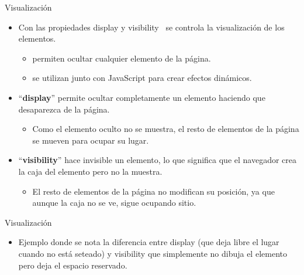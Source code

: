 \documentclass[aspectratio=43,10pt,t]{beamer}
\begin{document}
\begin{frame}{Visualización}\relax
\begingroup
{}
\begin{itemize}
  \item\relax Con las propiedades display y visibility ~se controla la visualización de los elementos. 
  \begin{itemize}
    \item\relax permiten ocultar cualquier elemento de la página. 
    \item\relax se utilizan junto con JavaScript para crear efectos dinámicos.
  \end{itemize}
  \item\relax “\textbf{display}” permite ocultar completamente un elemento haciendo que desaparezca de la página. 
  \begin{itemize}
    \item\relax Como el elemento oculto no se muestra, el resto de elementos de la página se mueven para ocupar su lugar.
  \end{itemize}
  \item\relax “\textbf{visibility}” hace invisible un elemento, lo que significa que el navegador crea la caja del elemento pero no la muestra. 
  \begin{itemize}
    \item\relax El resto de elementos de la página no modifican su posición, ya que aunque la caja no se ve, sigue ocupando sitio.
  \end{itemize}
\end{itemize}
\endgroup
\end{frame}

\begin{frame}{Visualización}\relax
\begingroup
{}
\begin{itemize}
  \item\relax Ejemplo donde se nota la diferencia entre display (que deja libre el lugar cuando no está seteado) y visibility que simplemente no dibuja el elemento pero deja el espacio reservado.
\end{itemize}
\endgroup
{}
\end{frame}
\end{document}
